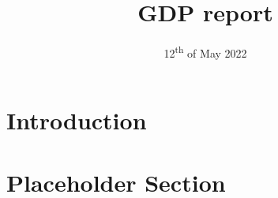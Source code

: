 \documentclass{article}
\title{GDP report}
\date{12\textsuperscript{th} of May 2022}
\begin{document}



\section{Introduction}


\section{Placeholder Section}

\end{document}
